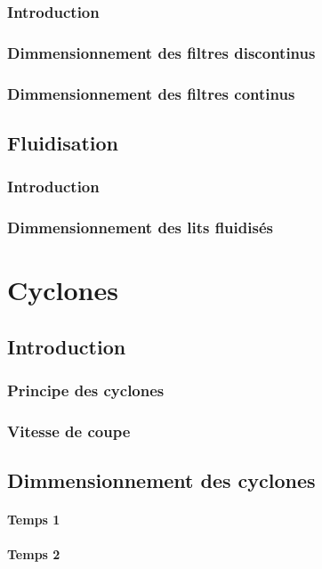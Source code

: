 \documentclass[11pt, a4paper, openany]{book}
\begin{document}
	\subsection{Introduction}
	\subsection{Dimmensionnement des filtres discontinus}
	\subsection{Dimmensionnement des filtres continus}
	
\section{Fluidisation}
	\subsection{Introduction}
	\subsection{Dimmensionnement des lits fluidisés}
	
	
\chapter{Cyclones}
\section{Introduction}
	\subsection{Principe des cyclones}
	\subsection{Vitesse de coupe}
	
\section{Dimmensionnement des cyclones}
		\subsubsection{Temps 1}
		\subsubsection{Temps 2}
	
\end{document}
